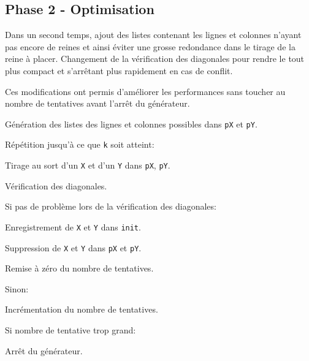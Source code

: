 \documentclass[a4paper, 10pt]{article}
\begin{document}
            \subsection{Phase 2 - Optimisation}
                Dans un second temps, ajout des listes contenant les lignes et colonnes n'ayant pas encore de reines et ainsi éviter une grosse redondance dans le tirage de la reine à placer. Changement de la vérification des diagonales pour rendre le tout plus compact et s'arrêtant plus rapidement en cas de conflit.

                Ces modifications ont permis d'améliorer les performances sans toucher au nombre de tentatives avant l'arrêt du générateur.

    			\begin{description}
    				\item Génération des listes des lignes et colonnes possibles dans \verb?pX? et \verb?pY?.
    				\item Répétition jusqu'à ce que \verb?k? soit atteint:
    				\begin{description}
    					\item Tirage au sort d'un \verb?X? et d'un \verb?Y? dans \verb?pX?, \verb?pY?.
    					\item Vérification des diagonales.
    					\item Si pas de problème lors de la vérification des diagonales:
    					\begin{description}
    						\item Enregistrement de \verb?X? et \verb?Y? dans \verb?init?.
    						\item Suppression de \verb?X? et \verb?Y? dans \verb?pX? et \verb?pY?.
                            \item Remise à zéro du nombre de tentatives.
    					\end{description}
                        \item Sinon:
                        \begin{description}
                            \item Incrémentation du nombre de tentatives.
                            \item Si nombre de tentative trop grand:
                            \begin{description}
                                \item Arrêt du générateur.
                            \end{description}
                        \end{description}
    				\end{description}
    			\end{description}
\end{document}
